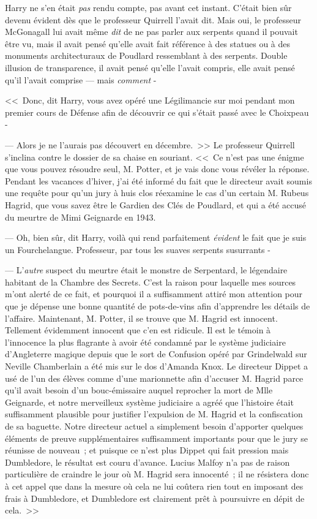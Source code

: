 Harry ne s'en était \emph{pas} rendu compte, pas avant cet instant. C'était bien sûr devenu évident dès que le professeur Quirrell l'avait dit. Mais oui, le professeur McGonagall lui avait même \emph{dit} de ne pas parler aux serpents quand il pouvait être vu, mais il avait pensé qu'elle avait fait référence à des statues ou à des monuments architecturaux de Poudlard ressemblant à des serpents. Double illusion de transparence, il avait pensé qu'elle l'avait compris, elle avait pensé qu'il l'avait comprise — mais \emph{comment} -

<<~Donc, dit Harry, vous avez opéré une Légilimancie sur moi pendant mon premier cours de Défense afin de découvrir ce qui s'était passé avec le Choixpeau -

--- Alors je ne l'aurais pas découvert en décembre.~>> Le professeur Quirrell s'inclina contre le dossier de sa chaise en souriant. <<~Ce n'est pas une énigme que vous pouvez résoudre seul, M. Potter, et je vais donc vous révéler la réponse. Pendant les vacances d'hiver, j'ai été informé du fait que le directeur avait soumis une requête pour qu'un jury à huis clos réexamine le cas d'un certain M. Rubeus Hagrid, que vous savez être le Gardien des Clés de Poudlard, et qui a été accusé du meurtre de Mimi Geignarde en 1943.

--- Oh, bien sûr, dit Harry, voilà qui rend parfaitement \emph{évident} le fait que je suis un Fourchelangue. Professeur, par tous les suaves serpents susurrants -

--- L'\emph{autre} suspect du meurtre était le monstre de Serpentard, le légendaire habitant de la Chambre des Secrets. C'est la raison pour laquelle mes sources m'ont alerté de ce fait, et pourquoi il a suffisamment attiré mon attention pour que je dépense une bonne quantité de pots-de-vins afin d'apprendre les détails de l'affaire. Maintenant, M. Potter, il se trouve que M. Hagrid est innocent. Tellement évidemment innocent que c'en est ridicule. Il est le témoin à l'innocence la plus flagrante à avoir été condamné par le système judiciaire d'Angleterre magique depuis que le sort de Confusion opéré par Grindelwald sur Neville Chamberlain a été mis sur le dos d'Amanda Knox. Le directeur Dippet a usé de l'un des élèves comme d'une marionnette afin d'accuser M. Hagrid parce qu'il avait besoin d'un bouc-émissaire auquel reprocher la mort de Mlle Geignarde, et notre merveilleux système judiciaire a agréé que l'histoire était suffisamment plausible pour justifier l'expulsion de M. Hagrid et la confiscation de sa baguette. Notre directeur actuel a simplement besoin d'apporter quelques éléments de preuve supplémentaires suffisamment importants pour que le jury se réunisse de nouveau~; et puisque ce n'est plus Dippet qui fait pression mais Dumbledore, le résultat est couru d'avance. Lucius Malfoy n'a pas de raison particulière de craindre le jour où M. Hagrid sera innocenté~; il ne résistera donc à cet appel que dans la mesure où cela ne lui coûtera rien tout en imposant des frais à Dumbledore, et Dumbledore est clairement prêt à poursuivre en dépit de cela.~>>

